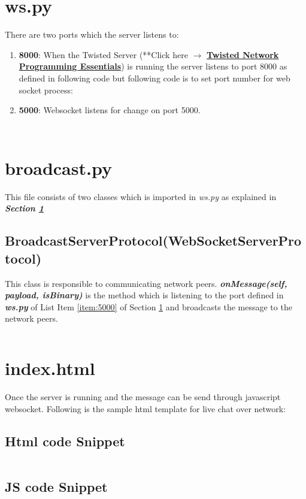 \documentclass[12pt, titlepage, onecolumn]{article}
\begin{document}
\section{ws.py}
\label{sec:ws.py}
There are two ports which the server listens to:



\begin{enumerate}
	\item {\bf 8000}: When the Twisted Server (**Click here $\rightarrow$ \href{https://twistedmatrix.com/trac/}{\bf Twisted Network Programming Essentials\cite{Fettig:2005:TNP:1205685}}) is running the server listens to port 8000 as defined in following code but following code is to set port number for web socket process:
	
	\item{\bf 5000}: Websocket listens for change on port 5000.
	\label{item:5000}
\end{enumerate}
\inputminted[firstline=1, lastline=20, linenos=true]{python}{../ws.py}
\inputminted[firstline=21, lastline=42, linenos=true]{python}{../ws.py}

\section{broadcast.py}
This file consists of two classes which is imported in \emph{ws.py} as explained in \emph{\bf Section \ref{sec:ws.py}}

\subsection{BroadcastServerProtocol(WebSocketServerProtocol)}
This class is responsible to communicating network peers. \emph{\bf onMessage(self, payload, isBinary)} is the method which is listening to the port defined in \emph{\bf ws.py} of List Item \ref{item:5000} of Section \ref{sec:ws.py} and broadcasts the message to the network peers.

\begin{listing}[H]
	\inputminted[firstline=1, lastline=25]{python}{../broadcast/broadcast.py}
\end{listing}

\section{index.html}
Once the server is running and the message can be send through javascript websocket. Following is the sample html template for live chat over network:

\subsection{Html code Snippet}
\begin{listing}[H]
	\inputminted[firstline=77, lastline=99, linenos=true]{html}{../index.html}
\end{listing}

\subsection{JS code Snippet}
	\inputminted[firstline=3, lastline=76, linenos=true]{html}{../index.html}

{}

	
\end{document}
